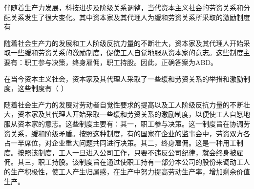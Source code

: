 \question 伴随着生产力发展，科技进步及阶级关系调整，当代资本主义社会的劳资关系和分配关系发生了很大变化。其中资本家及其代理人为缓和劳资关系所采取的激励制度有
\par{}
\begin{solution}随着社会生产力的发展和工人阶级反抗力量的不断壮大，资本家及其代理人开始采取一些缓和劳资关系的激励制度，促使工人自觉地服从资本家的意志。这些制度主要有：职工参与决策，终身雇佣，职工持股。因此，正确答案为ABD。
\end{solution}
\question 在当今资本主义社会，资本家及其代理人采取了一些缓和劳资关系的举措和激励制度，这些制度有（
）
\par{}
\begin{solution}随着社会生产力的发展对劳动者自觉性要求的提高以及工人阶级反抗力量的不断壮大，资本家及其代理人开始采取一些缓和劳资关系的激励制度，以便使工人自愿地服从资本家的意志。这些制度主要有：其一，职工参与决策。这一制度旨在协调劳资关系，缓和阶级矛盾。按照这种制度，有的国家在企业的监事会中，劳资双方各占一半席位，对企业重大问题共同进行决策。其二，终身雇佣。这是一种用工制度。按照该制度，工人一旦进入公司工作，只要不违反公司纪律，就会终身被雇佣。其三，职工持股。该制度旨在通过使职工持有一部分本公司的股份来调动工人的生产积极性，使工人产生归属感，在生产中努力提高劳动生产率，增加剩余价值生产。
\end{solution}
